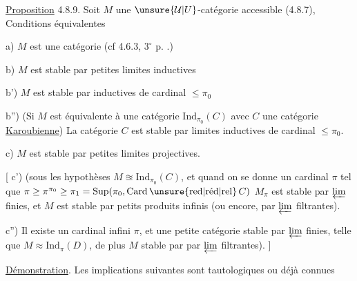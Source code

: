 \uline{Proposition} 4.8.9. Soit $M$ une $\unsure{\mathcal U|U}$-catégorie accessible (4.8.7),  Conditions équivalentes\unsure{:}

a) $M$ est une catégorie  (cf 4.6.3, $3^\circ$ p. .)

b) $M$ est stable par petites limites inductives

b')  $M$ est stable par  inductives de cardinal $\leq\pi_0$

b'') (Si $M$ est équivalente à une catégorie $\mathrm{Ind}_{\pi_0}(C)$ avec $C$ une  catégorie \uline{Karoubienne})  La catégorie $C$ est stable  par limites inductives de cardinal $\leq\pi_0$.

c) $M$ est stable par petites limites projectives.



[ c') (sous les hypothèses $M\approxeq\mathrm{Ind}_{\pi_0}(C)$, et  quand on se donne un cardinal $\pi$ tel que $\pi\geq\pi^{\pi_0}\geq\pi_1=\mathrm{Sup}(\pi_0,\mathrm{Card}\,\unsure{\mathrm{red}|\text{réd}|\mathrm{rel}}\,C)$ $M_\pi$ \deleted{$\unsure{\leq}$} est stable par $\varprojlim$ finies, et $M$ est stable par petits produits infinis (ou encore, par $\varprojlim$ filtrantes).

c'')  Il existe un cardinal infini $\pi$, et une petite catégorie  stable par $\varprojlim$ finies, telle que $M\approx\mathrm{Ind}_\pi(D)$, de plus $M$ stable par  par $\varprojlim$ filtrantes). ]

\uline{Démonstration}. Les implications suivantes sont tautologiques ou déjà \inserted{$\pm$} connues\unsure{:}

\diagram{\begin{tikzcd}[ampersand replacement=\&,column sep=small,row sep=small]
a \arrow[r,Leftrightarrow,"\unsure{\cdot}"'] \arrow[d,draw=none,"{\deleted{\unsure{\Downarrow|\Updownarrow}}}" description] \& b \arrow[r,Rightarrow,"{\text{\scriptsize cf. 4.4.14}}"] \arrow[dl,Rightarrow] \& b'\unsure{{[}} \arrow[r,Rightarrow,"\unsure{\cdot}"] \& b'' \\
c\,{[} \arrow[r,Rightarrow,"\unsure{\cdot}"] \& c' \arrow[r,Rightarrow] \& c''{]} \& {,}
\end{tikzcd}}

